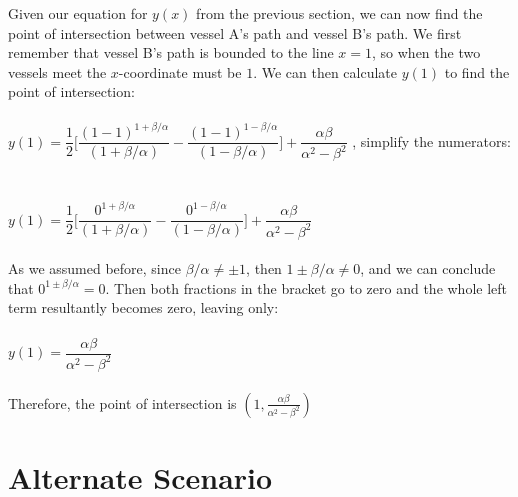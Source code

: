 \documentclass[12pt]{article}
\begin{document}
	\indent \indent Given our equation for $y(x)$ from the previous section, we can now find the point of intersection between vessel A's path and vessel B's path. We first remember that vessel B's path is bounded to the line $x=1$, so when the two vessels meet the $x$-coordinate must be $1$. We can then calculate $y(1)$ to find the point of intersection:
	\\
	\\
	$y(1)=\dfrac{1}{2}\bigg[ \dfrac{(1-1)^{1+\beta/\alpha}}{(1+\beta/\alpha)}-\dfrac{(1-1)^{1-\beta/\alpha}}{(1-\beta/\alpha)} \bigg] +\dfrac{\alpha\beta}{\alpha^2-\beta^2}$ \hspace{1cm} , simplify the numerators:
	\\
	\\
	\\
	$y(1)=\dfrac{1}{2}\bigg[ \dfrac{0^{1+\beta/\alpha}}{(1+\beta/\alpha)}-\dfrac{0^{1-\beta/\alpha}}{(1-\beta/\alpha)} \bigg] +\dfrac{\alpha\beta}{\alpha^2-\beta^2}$ 
	\\
	\\
	\indent As we assumed before, since $\beta/\alpha\neq\pm1$, then $1\pm\beta/\alpha\neq0$, and we can conclude that $0^{1\pm\beta/\alpha}=0$. Then both fractions in the bracket go to zero and the whole left term resultantly becomes zero, leaving only:
	\\
	\\
	$y(1)=\dfrac{\alpha\beta}{\alpha^2-\beta^2}$
	\\
	\\
	Therefore, the point of intersection is $(1,\frac{\alpha\beta}{\alpha^2-\beta^2})$
	
	\section{Alternate Scenario}
	
\end{document}
